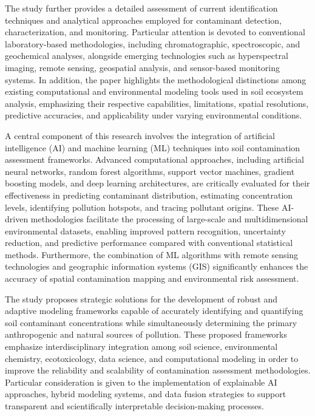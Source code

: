 \documentclass[sn-mathphys-num]{sn-jnl}
\begin{document}
The study further provides a detailed assessment of current identification
techniques and analytical approaches employed for contaminant detection,
characterization, and monitoring. Particular attention is devoted to
conventional laboratory-based methodologies, including chromatographic,
spectroscopic, and geochemical analyses, alongside emerging technologies such
as hyperspectral imaging, remote sensing, geospatial analysis, and
sensor-based monitoring systems. In addition, the paper highlights the
methodological distinctions among existing computational and environmental
modeling tools used in soil ecosystem analysis, emphasizing their respective
capabilities, limitations, spatial resolutions, predictive accuracies, and
applicability under varying environmental conditions.

A central component of this research involves the integration of artificial
intelligence (AI) and machine learning (ML) techniques into soil contamination
assessment frameworks. Advanced computational approaches, including artificial
neural networks, random forest algorithms, support vector machines, gradient
boosting models, and deep learning architectures, are critically evaluated for
their effectiveness in predicting contaminant distribution, estimating
concentration levels, identifying pollution hotspots, and tracing pollutant
origins. These AI-driven methodologies facilitate the processing of large-scale
and multidimensional environmental datasets, enabling improved pattern
recognition, uncertainty reduction, and predictive performance compared with
conventional statistical methods. Furthermore, the combination of ML algorithms
with remote sensing technologies and geographic information systems (GIS)
significantly enhances the accuracy of spatial contamination mapping and
environmental risk assessment.

The study proposes strategic solutions for the development of robust and
adaptive modeling frameworks capable of accurately identifying and quantifying
soil contaminant concentrations while simultaneously determining the primary
anthropogenic and natural sources of pollution. These proposed frameworks
emphasize interdisciplinary integration among soil science, environmental
chemistry, ecotoxicology, data science, and computational modeling in order
to improve the reliability and scalability of contamination assessment
methodologies. Particular consideration is given to the implementation of
explainable AI approaches, hybrid modeling systems, and data fusion strategies
to support transparent and scientifically interpretable decision-making
processes.
\end{document}
